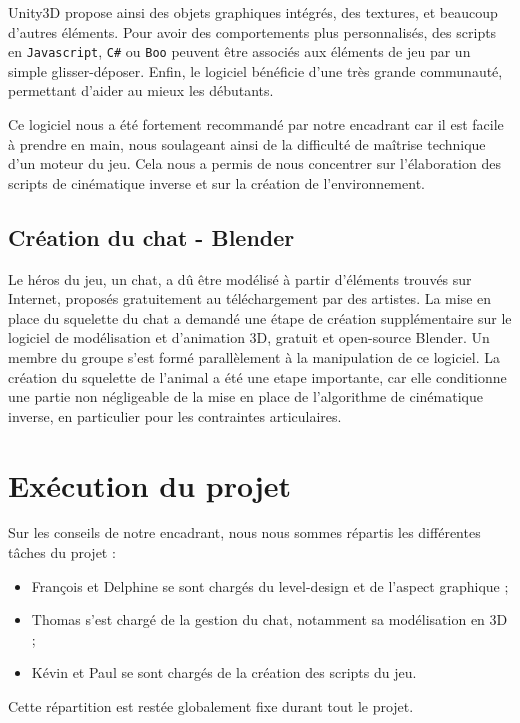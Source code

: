 \documentclass[a4paper,11pt]{article}
\begin{document}
Unity3D propose ainsi des objets graphiques intégrés, des textures, et beaucoup d'autres éléments. Pour avoir des comportements plus personnalisés, des scripts en \texttt{Javascript}, \texttt{C\#} ou \texttt{Boo} peuvent être associés aux éléments de jeu par un simple glisser-déposer. Enfin, le logiciel bénéficie d'une très grande communauté, permettant d'aider au mieux les débutants. 

Ce logiciel nous a été fortement recommandé par notre encadrant car il est facile à prendre en main, nous soulageant ainsi de la difficulté de maîtrise technique d'un moteur du jeu. Cela nous a permis de nous concentrer sur l'élaboration des scripts de cinématique inverse et sur la création de l'environnement.

\subsection{Création du chat - Blender}

Le héros du jeu, un chat, a dû être modélisé à partir d'éléments trouvés sur Internet, proposés gratuitement au téléchargement par des artistes. La mise en place du squelette du chat a demandé une étape de création supplémentaire sur le logiciel de modélisation et d'animation 3D, gratuit et open-source Blender. Un membre du groupe s'est formé parallèlement à la manipulation de ce logiciel. La création du squelette de l'animal a été une etape importante, car elle conditionne une partie non négligeable de la mise en place de l'algorithme de cinématique inverse, en particulier pour les contraintes articulaires. 

\section{Exécution du projet}
Sur les conseils de notre encadrant, nous nous sommes répartis les différentes tâches du projet : 
\begin{itemize}
\item François et Delphine se sont chargés du level-design et de l'aspect graphique ;
\item Thomas s'est chargé de la gestion du chat, notamment sa modélisation en 3D ;
\item Kévin et Paul se sont chargés de la création des scripts du jeu.
\end{itemize}
Cette répartition est restée globalement fixe durant tout le projet.
\end{document}

